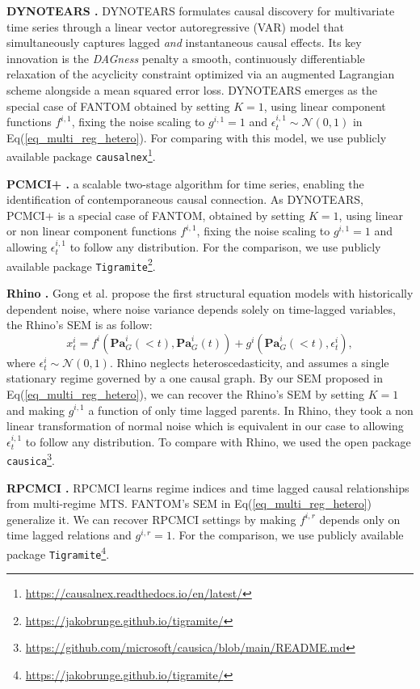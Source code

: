 \textbf{DYNOTEARS \citep{pamfil2020dynotears}. } 
DYNOTEARS formulates causal discovery for multivariate time series through a linear vector autoregressive (VAR) model that simultaneously captures lagged \emph{and} instantaneous causal effects.  
Its key innovation is the \emph{DAGness} penalty a smooth, continuously differentiable relaxation of the acyclicity constraint optimized via an augmented Lagrangian scheme alongside a mean squared error loss.  
DYNOTEARS emerges as the special case of \textsc{FANTOM} obtained by setting \(K=1\), using linear component functions \(f^{i,1}\), fixing the noise scaling to \(g^{i,1}=1\) and $\epsilon_t^{i,1} \sim \mathcal{N}(0,1)$ in Eq(\ref{eq_multi_reg_hetero}). For comparing with this model, we use publicly available package \texttt{causalnex}\footnote{\url{https://causalnex.readthedocs.io/en/latest/}}.

\textbf{PCMCI+ \citep{runge2020discovering}. }a scalable two-stage algorithm for time series, enabling the identification of contemporaneous causal connection. As DYNOTEARS, PCMCI+ is a special case of \textsc{FANTOM}, obtained by setting $K=1$, using linear or non linear component functions \(f^{i,1}\), fixing the noise scaling to \(g^{i,1}=1\) and allowing $\epsilon_t^{i,1}$ to follow any distribution. For the comparison, we use publicly available package \texttt{Tigramite}\footnote{\url{https://jakobrunge.github.io/tigramite/}}.

\textbf{Rhino \citep{gong2022rhino}. }Gong et al. propose the first structural equation models with historically dependent noise, where noise variance depends solely on time-lagged variables, the Rhino's SEM is as follow:
\begin{equation}
x_t^i=f^i\left(\mathbf{P a}_G^i(<t), \mathbf{P a}_G^i(t)\right)+g^i\left(\mathbf{P a}_G^i(<t), \epsilon_t^i\right),
\end{equation}
where $\epsilon_t^i \sim \mathcal{N}(0,1)$. Rhino neglects heteroscedasticity, and assumes a single stationary regime governed by a one causal graph. By our SEM proposed in Eq(\ref{eq_multi_reg_hetero}), we can recover the Rhino's SEM by setting \(K=1\) and making $g^{i,1}$ a function of only time lagged parents. In Rhino, they took a non linear transformation of normal noise which is equivalent in our case to allowing $\epsilon_t^{i,1}$ to follow any distribution. To compare with Rhino, we used the open package \texttt{causica}\footnote{\url{https://github.com/microsoft/causica/blob/main/README.md}}. 

\textbf{RPCMCI \citep{saggioro2020reconstructing}. } RPCMCI learns regime indices and time lagged causal relationships from multi-regime MTS. FANTOM's SEM in Eq(\ref{eq_multi_reg_hetero}) generalize it. We can recover RPCMCI settings by making \(f^{i,r}\) depends only on time lagged relations and \(g^{i,r}=1\). For the comparison, we use publicly available package \texttt{Tigramite}\footnote{\url{https://jakobrunge.github.io/tigramite/}}.

